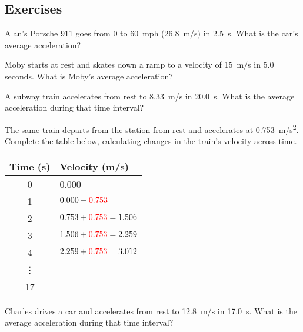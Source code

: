 \documentclass[main.tex]{subfiles}
\begin{document}
\subsection{Exercises}

\begin{exercise} \label{eBsToU}
    Alan's Porsche 911 goes from 0 to \SI{60}{mph} (\SI{26.8}{m/s}) in \SI{2.5}{s}. What is the car's average acceleration? 
\end{exercise}


\begin{exercise} \label{kVZPeG}
  Moby starts at rest and skates down a ramp to a velocity of \SI{15}{m/s} in 5.0 seconds. What is Moby's average acceleration? 
\end{exercise}

\begin{exercise} \label{Vth5N8}
    A subway train accelerates from rest to \SI{8.33}{m/s} in \SI{20.0}{s}. What is the average acceleration during that time interval?
\end{exercise}

\begin{exercise}
    The same train departs from the station from rest and accelerates at \SI{0.753}{m/s^2}. Complete the table below, calculating changes in the train's velocity across time.

\begin{center}
    \begin{tabular}{c|l}
        \textbf{Time (s)} & \textbf{Velocity (m/s)} \\
        \hline
        0 & 0.000\\
        1 & $0.000 + {\color{red}0.753}$\\
        2 & $0.753 + {\color{red}0.753} = 1.506$ \\
        3 & $1.506 + {\color{red}0.753} = 2.259$ \\
        4 & $2.259 + {\color{red}0.753} = 3.012$ \\
        \vdots &  \\
        17 &  \\
    \end{tabular}
\end{center}
\end{exercise}


\begin{exercise} \label{XSJU8b}
    Charles drives a car and accelerates from rest to \SI{12.8}{m/s} in \SI{17.0}{s}. What is the average acceleration during that time interval?
\end{exercise}
\end{document}
